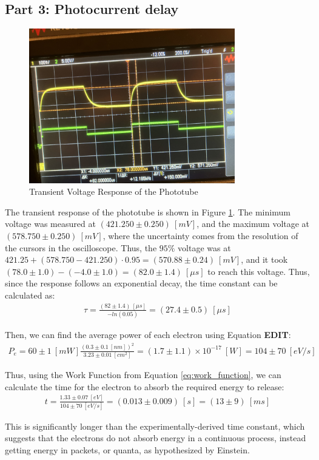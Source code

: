 \subsection{Part 3: Photocurrent delay}

\begin{figure}
    \centering
    \includegraphics[width=0.8\textwidth]{Results/Part3/V_Func.jpg}
    \caption{Transient Voltage Response of the Phototube}
    \label{fig:V_Func}
\end{figure}

The transient response of the phototube is shown in Figure \ref{fig:V_Func}. The minimum voltage was measured at $(421.250 \pm 0.250)~[mV]$, and the maximum voltage at $(578.750 \pm 0.250)~[mV]$, where the uncertainty comes from the resolution of the cursors in the oscilloscope. Thus, the $95\%$ voltage was at $421.25 + (578.750-421.250) \cdot 0.95 = (570.88 \pm 0.24)~[mV]$, and it took $(78.0 \pm 1.0) - (-4.0 \pm 1.0) = (82.0 \pm 1.4)~[\mu s]$ to reach this voltage. Thus, since the response follows an exponential decay, the time constant can be calculated as:
\begin{gather*}
    \tau = \frac{(82 \pm 1.4)~[\mu s]}{-ln(0.05)} = (27.4 \pm 0.5)~[\mu s]
\end{gather*}

Then, we can find the average power of each electron using Equation \textbf{EDIT}:
\begin{gather*}
    P_e = 60\pm1~[mW] \frac{(0.3 \pm 0.1~[nm])^2}{3.23\pm 0.01~[cm^2]} = (1.7 \pm 1.1) \times 10^{-17}~[W] = 104 \pm 70~[eV/s]
\end{gather*}

Thus, using the Work Function from Equation \ref{eq:work_function}, we can calculate the time for the electron to absorb the required energy to release:
\begin{gather*}
    t = \frac{1.33 \pm 0.07~[eV]}{104 \pm 70~[eV/s]} = (0.013 \pm 0.009)~[s] = (13 \pm 9)~[ms]
\end{gather*}

This is significantly longer than the experimentally-derived time constant, which suggests that the electrons do not absorb energy in a continuous process, instead getting energy in packets, or quanta, as hypothesized by Einstein.